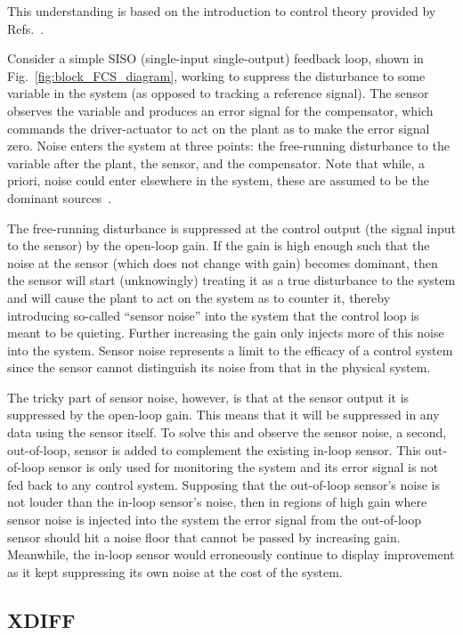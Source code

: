 \documentclass[aps,pra,superscriptaddress,reprint,nofootinbib]{revtex4-1}
\begin{document}
This understanding is based on the introduction to control theory provided by Refs.~\cite{Ward:2010,Bechhoefer:2005,FCS:2000}.


Consider a simple SISO (single-input single-output) feedback loop, shown in Fig.~\ref{fig:block_FCS_diagram}, working to suppress the disturbance to some variable in the system (as opposed to tracking a reference signal). The sensor observes the variable and produces an error signal for the compensator, which commands the driver-actuator to act on the plant as to make the error signal zero. Noise enters the system at three points: the free-running disturbance to the variable after the plant, the sensor, and the compensator. Note that while, a priori, noise could enter elsewhere in the system, these are assumed to be the dominant sources~\cite{FCS:2000}. 


The free-running disturbance is suppressed at the control output (the signal input to the sensor) by the open-loop gain. If the gain is high enough such that the noise at the sensor (which does not change with gain) becomes dominant, then the sensor will start (unknowingly) treating it as a true disturbance to the system and will cause the plant to act on the system as to counter it, thereby introducing so-called ``sensor noise'' into the system that the control loop is meant to be quieting. Further increasing the gain only injects more of this noise into the system. Sensor noise represents a limit to the efficacy of a control system since the sensor cannot distinguish its noise from that in the physical system.


The tricky part of sensor noise, however, is that at the sensor output it is suppressed by the open-loop gain. This means that it will be suppressed in any data using the sensor itself. To solve this and observe the sensor noise, a second, out-of-loop, sensor is added to complement the existing in-loop sensor. This out-of-loop sensor is only used for monitoring the system and its error signal is not fed back to any control system. Supposing that the out-of-loop sensor’s noise is not louder than the in-loop sensor’s noise, then in regions of high gain where sensor noise is injected into the system the error signal from the out-of-loop sensor should hit a noise floor that cannot be passed by increasing gain. Meanwhile, the in-loop sensor would erroneously continue to display improvement as it kept suppressing its own noise at the cost of the system.


\subsection{XDIFF}
\end{document}
